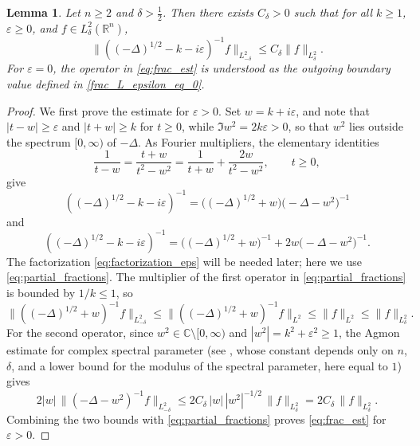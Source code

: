 \documentclass[12pt,a4paper]{amsart}
\numberwithin{equation}{section}
\theoremstyle{plain}
\newtheorem{lemma}[theorem]{Lemma}
\theoremstyle{definition}
\begin{document}
\begin{lemma}\label{lem:free_frac}
Let $n \geq 2$ and $\delta>\frac{1}{2}$. Then there exists $C_{\delta}>0$
such that for all $k\geq 1$, $\varepsilon\geq 0$, and
$f\in L^2_\delta(\mathbb R^n)$,
\begin{equation}\label{eq:frac_est}
\|((-\Delta)^{1/2} - k - i\varepsilon)^{-1}f\|_{L^2_{-\delta}} \leq C_\delta\|f\|_{L^2_\delta}.
\end{equation}
For $\varepsilon=0$, the operator in \eqref{eq:frac_est} is understood as the
outgoing boundary value defined in \eqref{frac_L_epsilon_eq_0}.
\end{lemma}
\begin{proof}
We first prove the estimate for $\varepsilon>0$. Set $w=k+i\varepsilon$, and
note that $|t-w|\geq\varepsilon$ and $|t+w|\geq k$ for $t\geq 0$, while
$\Im w^2=2k\varepsilon>0$, so that $w^2$ lies outside the spectrum
$[0,\infty)$ of $-\Delta$. As Fourier multipliers, the elementary identities
\[
    \frac{1}{t-w}
    =
    \frac{t+w}{t^2-w^2}
    =
    \frac{1}{t+w}+\frac{2w}{t^2-w^2},
    \qquad t\geq 0,
\]
give
\begin{equation}\label{eq:factorization_eps}
    \left((-\Delta)^{1/2}-k-i\varepsilon\right)^{-1}
    =
    \bigl((-\Delta)^{1/2}+w\bigr)
    \bigl(-\Delta-w^2\bigr)^{-1}
\end{equation}
and
\begin{equation}\label{eq:partial_fractions}
    \left((-\Delta)^{1/2}-k-i\varepsilon\right)^{-1}
    =
    \bigl((-\Delta)^{1/2}+w\bigr)^{-1}
    +
    2w\bigl(-\Delta-w^2\bigr)^{-1}.
\end{equation}
The factorization \eqref{eq:factorization_eps} will be needed later; here we
use \eqref{eq:partial_fractions}. The multiplier of the first operator in
\eqref{eq:partial_fractions} is bounded by $1/k\leq 1$, so
\[
    \|((-\Delta)^{1/2}+w)^{-1}f\|_{L^2_{-\delta}}
    \leq
    \|((-\Delta)^{1/2}+w)^{-1}f\|_{L^2}
    \leq
    \|f\|_{L^2}
    \leq
    \|f\|_{L^2_\delta}.
\]
For the second operator, since $w^2\in\mathbb{C}\setminus[0,\infty)$ and
$|w^2|=k^2+\varepsilon^2\geq 1$, the Agmon estimate for complex spectral
parameter (see \cite[Theorem~7.1.1]{FeldmanSaloUhlmann}, whose constant
depends only on $n$, $\delta$, and a lower bound for the modulus of the
spectral parameter, here equal to $1$) gives
\[
    2|w|\,\|(-\Delta-w^2)^{-1}f\|_{L^2_{-\delta}}
    \leq
    2C_\delta\,|w|\,|w^2|^{-1/2}\,\|f\|_{L^2_\delta}
    =
    2C_\delta\,\|f\|_{L^2_\delta}.
\]
Combining the two bounds with \eqref{eq:partial_fractions} proves
\eqref{eq:frac_est} for $\varepsilon>0$.


\end{proof}
\end{document}
